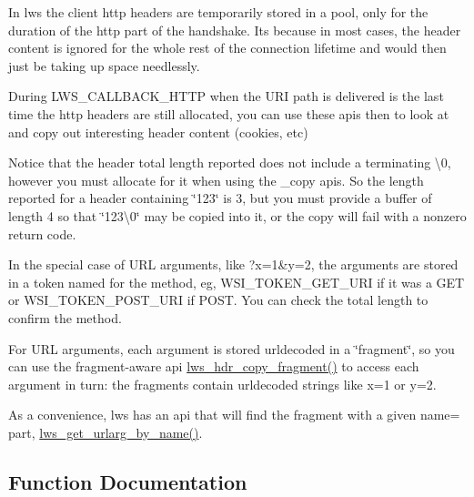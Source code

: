 In lws the client http headers are temporarily stored in a pool, only for the duration of the http part of the handshake. It\textquotesingle{}s because in most cases, the header content is ignored for the whole rest of the connection lifetime and would then just be taking up space needlessly.

During L\+W\+S\+\_\+\+C\+A\+L\+L\+B\+A\+C\+K\+\_\+\+H\+T\+TP when the U\+RI path is delivered is the last time the http headers are still allocated, you can use these apis then to look at and copy out interesting header content (cookies, etc)

Notice that the header total length reported does not include a terminating \textquotesingle{}\textbackslash{}0\textquotesingle{}, however you must allocate for it when using the \+\_\+copy apis. So the length reported for a header containing \char`\"{}123\char`\"{} is 3, but you must provide a buffer of length 4 so that \char`\"{}123\textbackslash{}0\char`\"{} may be copied into it, or the copy will fail with a nonzero return code.

In the special case of U\+RL arguments, like ?x=1\&y=2, the arguments are stored in a token named for the method, eg, W\+S\+I\+\_\+\+T\+O\+K\+E\+N\+\_\+\+G\+E\+T\+\_\+\+U\+RI if it was a G\+ET or W\+S\+I\+\_\+\+T\+O\+K\+E\+N\+\_\+\+P\+O\+S\+T\+\_\+\+U\+RI if P\+O\+ST. You can check the total length to confirm the method.

For U\+RL arguments, each argument is stored urldecoded in a \char`\"{}fragment\char`\"{}, so you can use the fragment-\/aware api \hyperlink{group__HTTP-headers-read_gaa427cad61a9a5e3004afd65c4527b5e9}{lws\+\_\+hdr\+\_\+copy\+\_\+fragment()} to access each argument in turn\+: the fragments contain urldecoded strings like x=1 or y=2.

As a convenience, lws has an api that will find the fragment with a given name= part, \hyperlink{group__HTTP-headers-read_ga84e9ce5e71a77501a0998ac403a984c2}{lws\+\_\+get\+\_\+urlarg\+\_\+by\+\_\+name()}. 

\subsection{Function Documentation}
